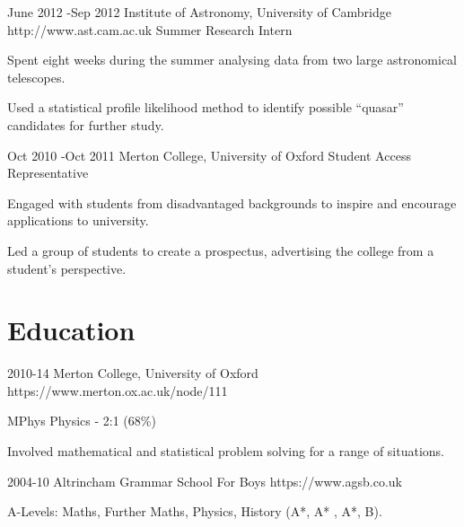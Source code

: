 \documentclass[10pt]{article} %
\begin{document}
\job
{June 2012 -}{Sep 2012}
{Institute of Astronomy, University of Cambridge}
{http://www.ast.cam.ac.uk}
{Summer Research Intern}
{\begin{itemize-noindent}
  \item{Spent eight weeks during the summer analysing data from two large astronomical telescopes.}
  \item{Used a statistical profile likelihood method to identify possible ``quasar'' candidates for further study.}
\end{itemize-noindent}}

\job
{Oct 2010 -}{Oct 2011}
{Merton College, University of Oxford}
{}
{Student Access Representative}
{\begin{itemize-noindent}
  \item{Engaged with students from disadvantaged backgrounds to inspire and encourage applications to university.}
  \item{Led a group of students to create a prospectus, advertising the college from a student's perspective.}
 \end{itemize-noindent}}


\section{Education}
\edu
{2010-14}
{Merton College, University of Oxford}
{https://www.merton.ox.ac.uk/node/111}
{
  \begin{itemize-noindent}
  \item{MPhys Physics - 2:1 (68\%)}
  \item{Involved mathematical and statistical problem solving for a range of situations.}
  \end{itemize-noindent}
}

\edu
{2004-10}
{Altrincham Grammar School For Boys}
{https://www.agsb.co.uk}
{
  \begin{itemize-noindent}
  \item{A-Levels: Maths, Further Maths, Physics, History (A*, A* , A*, B).}
  \end{itemize-noindent}
}

\end{document}
